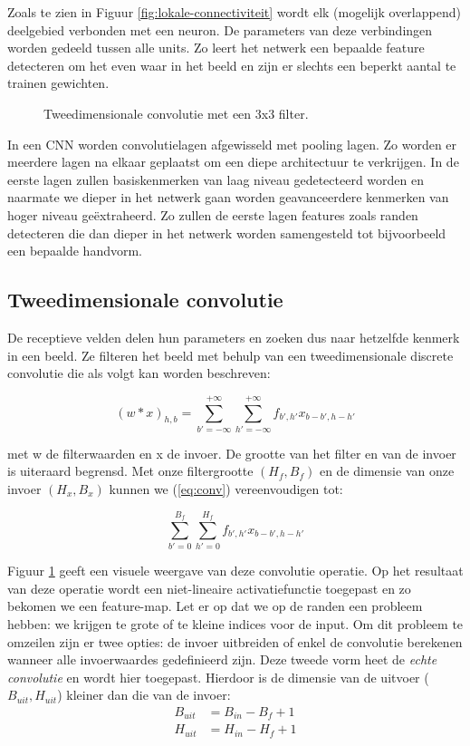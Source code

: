 \npar Zoals te zien in Figuur \ref{fig:lokale-connectiviteit} wordt elk (mogelijk overlappend) deelgebied verbonden met een neuron. De parameters van deze verbindingen worden gedeeld tussen alle units. Zo leert het netwerk een bepaalde feature detecteren om het even waar in het beeld en zijn er slechts een beperkt aantal te trainen gewichten.
 \begin{figure}[!t]
 	\centering
 	\def\svgwidth{0.55\columnwidth}
 	
 	\caption{Tweedimensionale convolutie met een 3x3 filter.}
 	\label{fig:conv}
 \end{figure}
\npar In een CNN worden convolutielagen afgewisseld met pooling lagen. Zo worden er meerdere lagen na elkaar geplaatst om een diepe architectuur te verkrijgen. In de eerste lagen zullen basiskenmerken van laag niveau gedetecteerd worden en naarmate we dieper in het netwerk gaan worden geavanceerdere kenmerken van hoger niveau ge\"extraheerd. Zo zullen de eerste lagen features zoals randen detecteren die dan dieper in het netwerk worden samengesteld tot bijvoorbeeld een bepaalde handvorm.

\subsection{Tweedimensionale convolutie}

De receptieve velden delen hun parameters en zoeken dus naar hetzelfde kenmerk in een beeld. Ze filteren het beeld met behulp van een tweedimensionale discrete convolutie die als volgt kan worden beschreven:

\begin{equation}\label{eq:conv}
(w * x)_{h,b} = \sum_{b'=-\infty}^{+\infty}\sum_{h'=-\infty}^{+\infty} f_{b',h'}x_{b-b',h-h'}
\end{equation}

\npar met w de filterwaarden en x de invoer. De grootte van het filter en van de invoer is uiteraard begrensd. Met onze filtergrootte $(H_f,B_f)$ en de dimensie van onze invoer $(H_x,B_x)$ kunnen we (\ref{eq:conv}) vereenvoudigen tot:

\begin{equation}
\sum_{b'=0}^{B_f}\sum_{h'=0}^{H_f} f_{b',h'}x_{b-b',h-h'}
\end{equation}

\npar Figuur \ref{fig:conv} geeft een visuele weergave van deze convolutie operatie. Op het resultaat van deze operatie wordt een niet-lineaire activatiefunctie toegepast en zo bekomen we een feature-map. Let er op dat we op de randen een probleem hebben: we krijgen te grote of te kleine indices voor de input. Om dit probleem te omzeilen zijn er twee opties: de invoer uitbreiden of enkel de convolutie berekenen wanneer alle invoerwaardes gedefinieerd zijn. Deze tweede vorm heet de \textit{echte convolutie} en wordt hier toegepast. Hierdoor is de dimensie van de uitvoer ($B_{uit},H_{uit}$) kleiner dan die van de invoer:
\begin{equation}
\begin{aligned}
B_{uit}&=B_{in}-B_f+1 \\
H_{uit}&=H_{in}-H_f+1
\end{aligned}
\end{equation}


